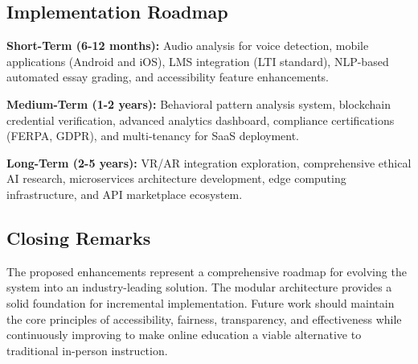 \subsection{Implementation Roadmap}

\textbf{Short-Term (6-12 months):} Audio analysis for voice detection, mobile applications (Android and iOS), LMS integration (LTI standard), NLP-based automated essay grading, and accessibility feature enhancements.

\textbf{Medium-Term (1-2 years):} Behavioral pattern analysis system, blockchain credential verification, advanced analytics dashboard, compliance certifications (FERPA, GDPR), and multi-tenancy for SaaS deployment.

\textbf{Long-Term (2-5 years):} VR/AR integration exploration, comprehensive ethical AI research, microservices architecture development, edge computing infrastructure, and API marketplace ecosystem.

\subsection{Closing Remarks}

The proposed enhancements represent a comprehensive roadmap for evolving the system into an industry-leading solution. The modular architecture provides a solid foundation for incremental implementation. Future work should maintain the core principles of accessibility, fairness, transparency, and effectiveness while continuously improving to make online education a viable alternative to traditional in-person instruction.
